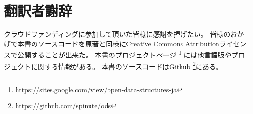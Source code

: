 \chapter*{翻訳者謝辞}
クラウドファンディングに参加して頂いた皆様に感謝を捧げたい。
皆様のおかげで本書のソースコードを原著と同様にCreative Commons Attributionライセンスで公開することが出来た。
本書のプロジェクトページ \footnote {\url{https://sites.google.com/view/open-data-structures-ja}} には他言語版やプロジェクトに関する情報がある。
本書のソースコードはGithub \footnote {\url{https://github.com/spinute/ods}}にある。
